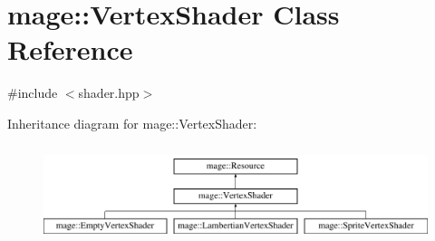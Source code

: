 \hypertarget{classmage_1_1_vertex_shader}{}\section{mage\+:\+:Vertex\+Shader Class Reference}
\label{classmage_1_1_vertex_shader}


{\ttfamily \#include $<$shader.\+hpp$>$}

Inheritance diagram for mage\+:\+:Vertex\+Shader\+:\begin{figure}[H]
\begin{center}
\leavevmode
\includegraphics[height=2.857143cm]{classmage_1_1_vertex_shader}
\end{center}
\end{figure}
